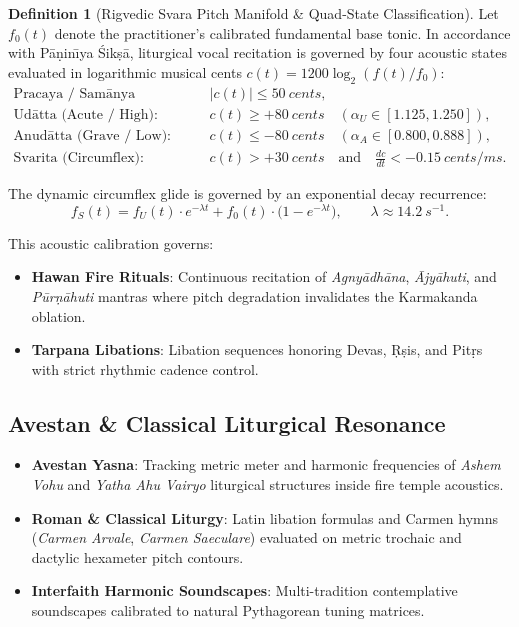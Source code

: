 \documentclass[11pt,a4paper,reqno]{article}
\def\mathrm#1{#1}%
\theoremstyle{plain}
\theoremstyle{definition}
\newtheorem{definition}[theorem]{Definition}
\theoremstyle{remark}
\numberwithin{equation}{section}
\begin{document}
\begin{definition}[{Rigvedic Svara Pitch Manifold \& Quad-State Classification}]
Let $f_0(t)$ denote the practitioner's calibrated fundamental base tonic. In accordance with P\={a}\d{n}in\={\i}ya \'{S}ik\d{s}\={a}, liturgical vocal recitation is governed by four acoustic states evaluated in logarithmic musical cents $c(t) = 1200 \log_2(f(t)/f_0)$:
\begin{align}
\label{eq:pracaya_pitch}
\text{Pracaya / Sam\={a}nya (Baseline):} \quad & |c(t)| \le 50\ \mathrm{cents}, \\
\label{eq:udatta_pitch}
\text{Ud\={a}tta (Acute / High):} \quad & c(t) \ge +80\ \mathrm{cents} \quad (\alpha_{\mathrm{U}} \in [1.125, 1.250]), \\
\label{eq:anudatta_pitch}
\text{Anud\={a}tta (Grave / Low):} \quad & c(t) \le -80\ \mathrm{cents} \quad (\alpha_{\mathrm{A}} \in [0.800, 0.888]), \\
\label{eq:svarita_pitch}
\text{Svarita (Circumflex):} \quad & c(t) > +30\ \mathrm{cents} \quad \text{and} \quad \frac{dc}{dt} < -0.15\ \mathrm{cents/ms}.
\end{align}
\end{definition}

The dynamic circumflex glide is governed by an exponential decay recurrence:
\begin{equation}
\label{eq:svarita_glide}
f_{\mathrm{S}}(t) = f_{\mathrm{U}}(t) \cdot e^{-\lambda t} + f_0(t) \cdot \big(1 - e^{-\lambda t}\big), \qquad \lambda \approx 14.2\ \mathrm{s}^{-1}.
\end{equation}

This acoustic calibration governs:
\begin{itemize}
    \item \textbf{Hawan Fire Rituals}: Continuous recitation of \emph{Agny\={a}dh\={a}na}, \emph{\={A}jy\={a}huti}, and \emph{P\={u}r\d{n}\={a}huti} mantras where pitch degradation invalidates the Karmakanda oblation.
    \item \textbf{Tarpana Libations}: Libation sequences honoring Devas, \d{R}\d{s}is, and Pit\d{r}s with strict rhythmic cadence control.
\end{itemize}

\subsection{\texorpdfstring{Avestan \& Classical Liturgical Resonance}{Avestan and Classical Liturgical Resonance}}
\begin{itemize}
    \item \textbf{Avestan Yasna}: Tracking metric meter and harmonic frequencies of \emph{Ashem Vohu} and \emph{Yatha Ahu Vairyo} liturgical structures inside fire temple acoustics.
    \item \textbf{Roman \& Classical Liturgy}: Latin libation formulas and Carmen hymns (\emph{Carmen Arvale}, \emph{Carmen Saeculare}) evaluated on metric trochaic and dactylic hexameter pitch contours.
    \item \textbf{Interfaith Harmonic Soundscapes}: Multi-tradition contemplative soundscapes calibrated to natural Pythagorean tuning matrices.
\end{itemize}
\end{document}
